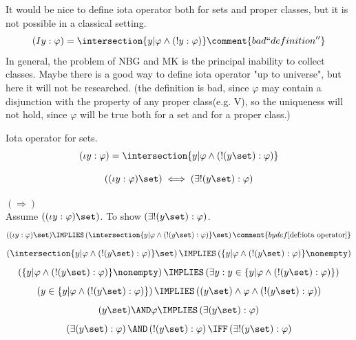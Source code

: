 It would be nice to define iota operator both for sets and proper classes, but it is not possible in a classical setting.
\[
(I y: \varphi) = \intersection \{y|\varphi \land (!y:\varphi)\}
\comment{bad ``definition''}
\]
In general, the problem of NBG and MK is the principal inability to collect classes. Maybe there is a good way to define iota operator "up to universe", but here it will not be researched.
(the definition is bad, since $\varphi$ may contain a disjunction with the property of any proper class(e.g. V), so the uniqueness will not hold, since $\varphi$ will be true both for a set and for a proper class.)
\begin{definition}
\label{def:iota operator}
Iota operator for sets.
\[
(\iota y: \varphi) = \intersection \{y|\varphi \land (!(y\set):\varphi)\}
\]
\end{definition}



\begin{theorem}
\label{thm:iota set exists unique set}
\[
((\iota y: \varphi) \set)
\iff
(\exists!(y\set):\varphi)
\]

\end{theorem}
\Proof
\noindent$(\Rightarrow)$\\
Assume $((\iota y: \varphi) \set)$. To show $(\exists!(y\set):\varphi)$.
\[
((\iota y: \varphi) \set)
\IMPLIES
\left(\intersection \{y|\varphi \land (!(y\set):\varphi)\} \set\right)
\comment{by def \ref{def:iota operator}}
\]
\[
\left(\intersection \{y|\varphi \land (!(y\set):\varphi)\} \set\right)
\IMPLIES
\left(\{y|\varphi \land (!(y\set):\varphi)\}\nonempty\right)
\]
\[
\left(\{y|\varphi \land (!(y\set):\varphi)\}\nonempty\right)
\IMPLIES
\left(\exists	y: y\in \{y|\varphi \land (!(y\set):\varphi)\}\right)
\]
\[
\left(
y\in \{y|\varphi \land (!(y\set):\varphi)\}
\right)
\IMPLIES
\left(
(y\set)\land \varphi\land (!(y\set):\varphi)
\right)
\]
\[
(y\set)
\AND
\varphi
\IMPLIES
\left(
\exists (y\set):\varphi
\right)
\]
\[
\left(
\exists (y\set):\varphi
\right)
\AND
\left(
!(y\set):\varphi
\right)
\IFF
\left(
\exists! (y\set):\varphi
\right)
\]

